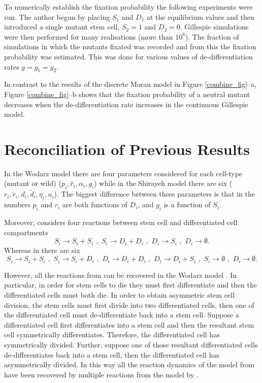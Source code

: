 \documentclass[12pt]{article}
\begin{document}
To numerically establish the fixation probability the following experiments were run. The author begun by placing $S_1$ and $D_1$ at the equilibrium values and then introduced a single mutant stem cell, $S_2=1$ and $D_2=0$. Gillespie simulations were then performed \cite{gillespie} for many realisations (more than $10^8$). The fraction of simulations in which the mutants fixated was recorded and from this the fixation probability was estimated. This was done for various values of de-differentiation rates $g=g_1=g_2$.

In contrast to the results of the discrete Moran model in Figure \ref{combine_fig}--a, Figure \ref{combine_fig}--b shows that the fixation probability of a neutral mutant decreases when the de-differentiation rate increases in the continuous Gillespie model.

\section{Reconciliation of Previous Results}\label{recon}

In the Wodarz model there are four parameters considered for each cell-type (mutant or wild) ($p_i, \hat{r}_i, \alpha_i, g_i$) while in the Shirayeh model there are six ($r_i,\tilde{r}_i, d_i, \tilde{d}_i, \eta_i, u_i$). The biggest difference between these parameters is that in \cite{wodarz} the numbers $p_i$ and $r_i$ are both functions of $D_i$, and $g_i$ is a function of $S_i$.

Moreover, \cite{wodarz} considers four reactions between stem cell and differentiated cell compartments 
\[S_i\to S_i+S_i \,\, , \,\, S_i\to D_i+D_i \,\, , \,\, D_i\to S_i \,\, , \,\, D_i\to \emptyset.\] 
Whereas in \cite{mohammad} there are six
\[
S_i\to S_i+S_i \,\, , \,\, S_i\to S_i+D_i \,\, , \,\, D_i\to D_i+D_i \,\, , \,\, D_i\to D_i+S_i \,\, , \,\, S_i\to\emptyset \,\, , \,\, D_i\to\emptyset.
\]

However, all the reactions from \cite{mohammad} can be recovered in the Wodarz model \cite{wodarz}. In particular, in order for stem cells to die they must first differentiate and then the differentiated cells must both die. In order to obtain asymmetric stem cell division, the stem cells must first divide into two differentiated cells, then one of the differentiated cell must de-differentiate back into a stem cell. Suppose a differentiated cell first differentiates into a stem cell and then the resultant stem cell symmetrically differentiates. Therefore, the differentiated cell has symmetrically divided. Further, suppose one of those resultant differentiated cells de-differentiates back into a stem cell, then the differentiated cell has asymmetrically divided. In this way all the reaction dynamics of the model from \cite{mohammad} have been recovered by multiple reactions from the model by \cite{wodarz}.
\end{document}
